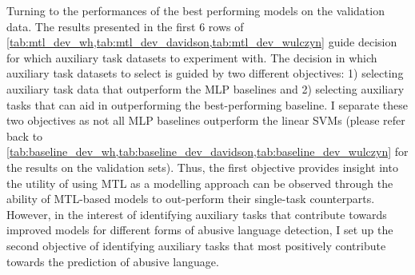 Turning to the performances of the best performing models on the validation data. 
The results presented in the first 6 rows of \cref{tab:mtl_dev_wh,tab:mtl_dev_davidson,tab:mtl_dev_wulczyn} guide decision for which auxiliary task datasets to experiment with.
The decision in which auxiliary task datasets to select is guided by two different objectives: 1) selecting auxiliary task data that outperform the MLP baselines and 2) selecting auxiliary tasks that can aid in outperforming the best-performing baseline.
I separate these two objectives as not all MLP baselines outperform the linear SVMs (please refer back to \cref{tab:baseline_dev_wh,tab:baseline_dev_davidson,tab:baseline_dev_wulczyn} for the results on the validation sets).
Thus, the first objective provides insight into the utility of using MTL as a modelling approach can be observed through the ability of MTL-based models to out-perform their single-task counterparts.
However, in the interest of identifying auxiliary tasks that contribute towards improved models for different forms of abusive language detection, I set up the second objective of identifying auxiliary tasks that most positively contribute towards the prediction of abusive language.


